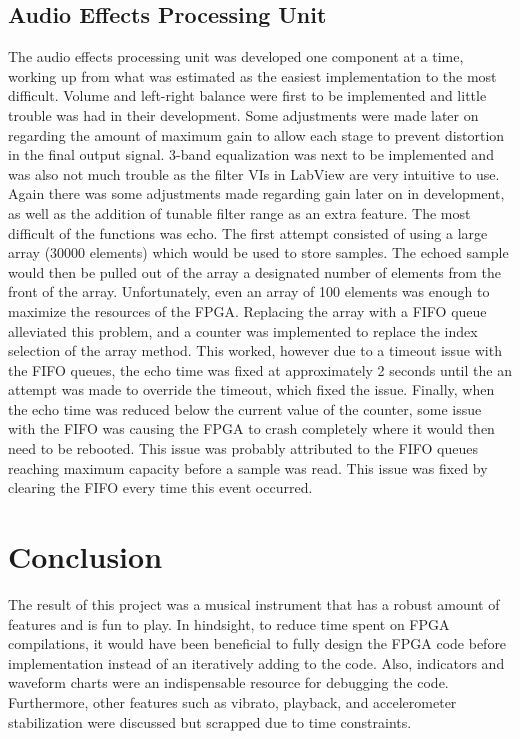 \subsection{Audio Effects Processing Unit}
The audio effects processing unit was developed one component at a time, working up from what was estimated as the easiest implementation to the most difficult. 
Volume and left-right balance were first to be implemented and little trouble was had in their development. Some adjustments were made later on regarding the amount of maximum gain to allow each stage to prevent distortion in the final output signal. 
3-band equalization was next to be implemented and was also not much trouble as the filter VIs in LabView are very intuitive to use.
 Again there was some adjustments made regarding gain later on in development, as well as the addition of tunable filter range as an extra feature. 
The most difficult of the functions was echo. 
The first attempt consisted of using a large array (30000 elements) which would be used to store samples. 
The echoed sample would then be pulled out of the array a designated number of elements from the front of the array. Unfortunately, even an array of 100 elements was enough to maximize the resources of the FPGA. 
Replacing the array with a FIFO queue alleviated this problem, and a counter was implemented to replace the index selection of the array method. 
This worked, however due to a timeout issue with the FIFO queues, the echo time was fixed at approximately 2 seconds until the an attempt was made to override the timeout, which fixed the issue. 
Finally, when the echo time was reduced below the current value of the counter, some issue with the FIFO was causing the FPGA to crash completely where it would then need to be rebooted. 
This issue was probably attributed to the FIFO queues reaching maximum capacity before a sample was read. 
This issue was fixed by clearing the FIFO every time this event occurred. 


\section{Conclusion}
The result of this project was a musical instrument that has a robust amount of features and is fun to play.
 In hindsight, to reduce time spent on FPGA compilations, it would have been beneficial to fully design the FPGA code before implementation instead of an iteratively adding to the code.
 Also, indicators and waveform charts were an indispensable resource for debugging the code.
 Furthermore, other features such as vibrato, playback, and accelerometer stabilization were discussed but scrapped due to time constraints.

